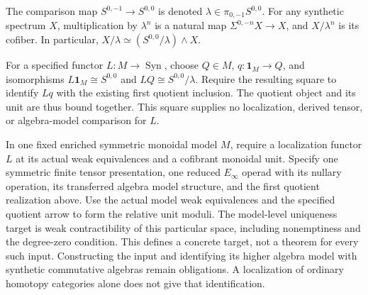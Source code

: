 \begin{definition}
  \label{def:synthetic-lambda-quotient}
  \notready
  The comparison map $S^{0,-1}\to S^{0,0}$ is denoted
  $\lambda\in\pi_{0,-1}S^{0,0}$.  For any synthetic spectrum $X$, multiplication
  by $\lambda^n$ is a natural map
  $\Sigma^{0,-n}X\to X$, and $X/\lambda^n$ is its cofiber.  In particular,
  $X/\lambda\simeq(S^{0,0}/\lambda)\mathbin{\wedge}X$.
\end{definition}

\begin{definition}
  \label{def:lambda-quotient-realization}
  For a specified functor $L:M\to\operatorname{Syn}$, choose $Q\in M$,
  $q:\mathbf1_M\to Q$, and isomorphisms
  $L\mathbf1_M\cong S^{0,0}$ and $LQ\cong S^{0,0}/\lambda$.
  Require the resulting square to identify $Lq$ with the existing first
  quotient inclusion. The quotient object and its unit are thus bound
  together. This square supplies no localization, derived tensor, or
  algebra-model comparison for $L$.
\end{definition}

\begin{definition}
  \label{def:lambda-quotient-operadic-target}
  In one fixed enriched symmetric monoidal model $M$, require a
  localization functor $L$ at its actual weak equivalences and a cofibrant
  monoidal unit. Specify one symmetric finite tensor presentation, one
  reduced $E_\infty$ operad with its nullary operation, its transferred
  algebra model structure, and the first quotient realization above.
  Use the actual model weak equivalences and the specified quotient
  arrow to form the relative unit moduli. The model-level uniqueness
  target is weak contractibility of this particular space, including
  nonemptiness and the degree-zero condition.
  This defines a concrete target, not a theorem for every such input.
  Constructing the input and identifying its higher algebra model with
  synthetic commutative algebras remain obligations. A localization of
  ordinary homotopy categories alone does not give that identification.
\end{definition}

